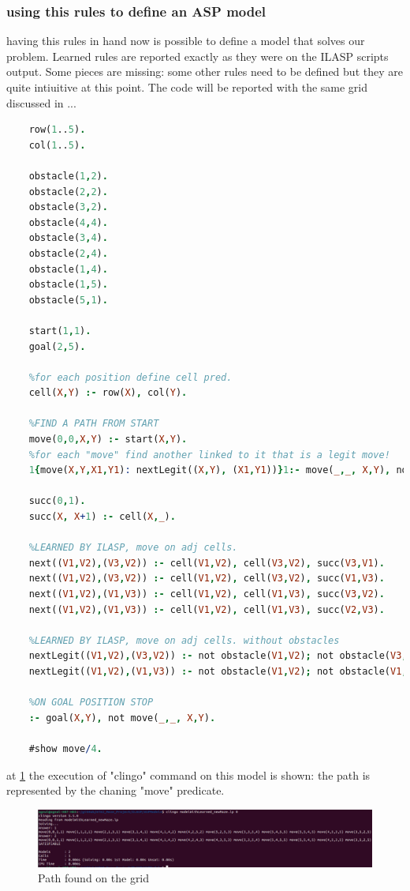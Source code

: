 \newpage

\subsubsection{using this rules to define an ASP model}
having this rules in hand now is possible to define a model that solves our problem. Learned rules are reported exactly as they were on the ILASP scripts output. Some pieces are missing: some other rules need to be defined but they are quite intiuitive at this point. The code will be reported with the same grid discussed in ...
 
 \newpage
\begin{lstlisting}[language=Prolog]
	%MODEL THAT SOLVES PROBLEM OF PATHFINDING IN THE GRID
	row(1..5).
	col(1..5).
	
	obstacle(1,2).
	obstacle(2,2).
	obstacle(3,2).
	obstacle(4,4).
	obstacle(3,4).
	obstacle(2,4).
	obstacle(1,4).
	obstacle(1,5).
	obstacle(5,1).
	
	start(1,1).
	goal(2,5).
	
	%for each position define cell pred.
	cell(X,Y) :- row(X), col(Y).
	
	%FIND A PATH FROM START
	move(0,0,X,Y) :- start(X,Y).
	%for each "move" find another linked to it that is a legit move!
	1{move(X,Y,X1,Y1): nextLegit((X,Y), (X1,Y1))}1:- move(_,_, X,Y), not goal(X,Y).
	
	succ(0,1).
	succ(X, X+1) :- cell(X,_).
	
	%LEARNED BY ILASP, move on adj cells.
	next((V1,V2),(V3,V2)) :- cell(V1,V2), cell(V3,V2), succ(V3,V1).
	next((V1,V2),(V3,V2)) :- cell(V1,V2), cell(V3,V2), succ(V1,V3).
	next((V1,V2),(V1,V3)) :- cell(V1,V2), cell(V1,V3), succ(V3,V2).
	next((V1,V2),(V1,V3)) :- cell(V1,V2), cell(V1,V3), succ(V2,V3).
	
	%LEARNED BY ILASP, move on adj cells. without obstacles
	nextLegit((V1,V2),(V3,V2)) :- not obstacle(V1,V2); not obstacle(V3,V2); next((V3,V2),(V1,V2)).
	nextLegit((V1,V2),(V1,V3)) :- not obstacle(V1,V2); not obstacle(V1,V3); next((V1,V2),(V1,V3)).
	
	%ON GOAL POSITION STOP
	:- goal(X,Y), not move(_,_, X,Y).
	
	#show move/4.
\end{lstlisting}

at \ref{fig:asd3} the execution of "clingo" command on this model is shown: the path is represented by the chaning "move" predicate.

\newpage
\begin{figure}
	\includegraphics[scale=0.35]{img/outputModel_newMaze.png}
	\caption{Path found on the grid}\label{fig:asd3}
\end{figure}

